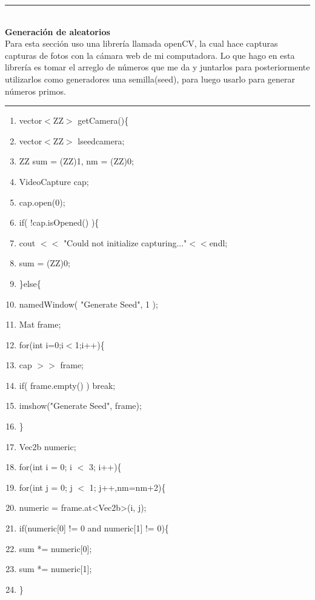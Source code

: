 \documentclass[11pt, conference]{IEEEtran}
\begin{document}
\rule[0mm]{181mm}{0.1mm}\\
\textbf{Generación de aleatorios}\\
Para esta sección uso una librería llamada openCV, la cual hace capturas capturas de fotos con la cámara web de mi computadora. Lo que hago en esta librería es tomar el arreglo de números que me da y juntarlos para posteriormente utilizarlos como generadores una semilla(seed), para luego usarlo para generar números primos. 
\rule[3mm]{181mm}{0.1mm}
\begin{enumerate}
	\item vector$<$ZZ$>$ getCamera()\{
	\item \qquad vector$<$ZZ$>$ lseedcamera;
	\item \qquad ZZ sum = (ZZ)1, nm = (ZZ)0;
	\item \qquad VideoCapture cap;
	\item \qquad cap.open(0);
	\item \qquad if( !cap.isOpened() )\{
	\item \qquad\qquad cout $<<$ "Could not initialize capturing..."$<<$endl;
	\item \qquad\qquad sum = (ZZ)0; 
	\item \qquad \}else\{	
	\item \qquad\qquad namedWindow( "Generate Seed", 1 );
	\item \qquad\qquad Mat frame;
	\item \qquad\qquad for(int i=0;i$<$1;i++)\{
	\item \qquad\qquad\qquad cap $>>$ frame;
	\item \qquad\qquad\qquad if( frame.empty() ) break;
	\item \qquad\qquad\qquad imshow("Generate Seed", frame);
	\item \qquad\}
	\item \qquad\qquad Vec2b numeric;
	\item \qquad\qquad for(int i = 0; i $<$ 3; i++)\{
	\item \qquad\qquad\qquad for(int j = 0; j $<$ 1; j++,nm=nm+2)\{
	\item \qquad\qquad\qquad\qquad numeric = frame.at<Vec2b>(i, j);
	\item \qquad\qquad\qquad\qquad if(numeric[0] != 0 and numeric[1] != 0)\{
	\item \qquad\qquad\qquad\qquad\qquad sum *= numeric[0];
	\item \qquad\qquad\qquad\qquad\qquad sum *= numeric[1];
	\item \qquad\qquad\qquad\qquad\}

\end{enumerate}
\end{document}
